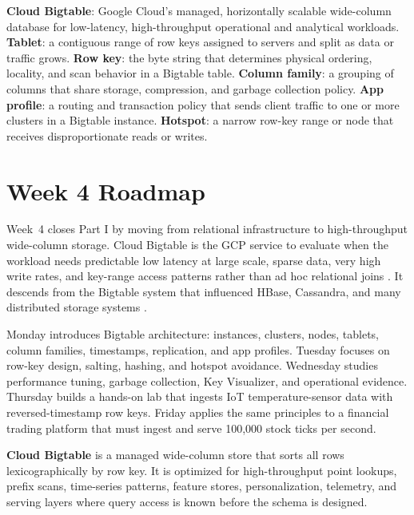 \begin{keyterms}
\textbf{Cloud Bigtable}: Google Cloud's managed, horizontally scalable wide-column database for low-latency, high-throughput operational and analytical workloads.
\textbf{Tablet}: a contiguous range of row keys assigned to servers and split as data or traffic grows.
\textbf{Row key}: the byte string that determines physical ordering, locality, and scan behavior in a Bigtable table.
\textbf{Column family}: a grouping of columns that share storage, compression, and garbage collection policy.
\textbf{App profile}: a routing and transaction policy that sends client traffic to one or more clusters in a Bigtable instance.
\textbf{Hotspot}: a narrow row-key range or node that receives disproportionate reads or writes.
\end{keyterms}

\section{Week 4 Roadmap}
Week~4 closes Part I by moving from relational infrastructure to high-throughput wide-column storage. Cloud Bigtable is the GCP service to evaluate when the workload needs predictable low latency at large scale, sparse data, very high write rates, and key-range access patterns rather than ad hoc relational joins \cite{googlecloudbigtabledocs}. It descends from the Bigtable system that influenced HBase, Cassandra, and many distributed storage systems \cite{chang2008bigtable}.

Monday introduces Bigtable architecture: instances, clusters, nodes, tablets, column families, timestamps, replication, and app profiles. Tuesday focuses on row-key design, salting, hashing, and hotspot avoidance. Wednesday studies performance tuning, garbage collection, Key Visualizer, and operational evidence. Thursday builds a hands-on lab that ingests IoT temperature-sensor data with reversed-timestamp row keys. Friday applies the same principles to a financial trading platform that must ingest and serve 100,000 stock ticks per second.

\begin{definitionbox}
\textbf{Cloud Bigtable} is a managed wide-column store that sorts all rows lexicographically by row key. It is optimized for high-throughput point lookups, prefix scans, time-series patterns, feature stores, personalization, telemetry, and serving layers where query access is known before the schema is designed.
\end{definitionbox}

